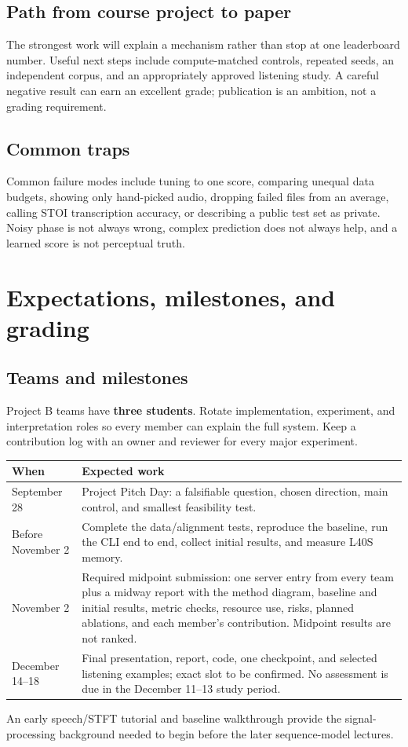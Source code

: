 \documentclass[11pt,letterpaper]{article}
\newcommand{\page}[1]{\clearpage\section{#1}}
\newcommand{\smallnote}[1]{{\small\color{graytext}#1\par}}
\begin{document}
\subsection{Path from course project to paper}
The strongest work will explain a mechanism rather than stop at one leaderboard number. Useful next steps include compute-matched controls, repeated seeds, an independent corpus, and an appropriately approved listening study. A careful negative result can earn an excellent grade; publication is an ambition, not a grading requirement.

\subsection{Common traps}
Common failure modes include tuning to one score, comparing unequal data budgets, showing only hand-picked audio, dropping failed files from an average, calling STOI transcription accuracy, or describing a public test set as private. Noisy phase is not always wrong, complex prediction does not always help, and a learned score is not perceptual truth.

\page{Expectations, milestones, and grading}
\subsection{Teams and milestones}
Project B teams have \textbf{three students}. Rotate implementation, experiment, and interpretation roles so every member can explain the full system. Keep a contribution log with an owner and reviewer for every major experiment.

\begin{center}\small
\begin{tabularx}{\linewidth}{@{}p{1.55in}Y@{}}
\toprule
When & Expected work\\\midrule
September 28 & Project Pitch Day: a falsifiable question, chosen direction, main control, and smallest feasibility test.\\
Before November 2 & Complete the data/alignment tests, reproduce the baseline, run the CLI end to end, collect initial results, and measure L40S memory.\\
November 2 & Required midpoint submission: one server entry from every team plus a midway report with the method diagram, baseline and initial results, metric checks, resource use, risks, planned ablations, and each member's contribution. Midpoint results are not ranked.\\
December 14--18 & Final presentation, report, code, one checkpoint, and selected listening examples; exact slot to be confirmed. No assessment is due in the December 11--13 study period.\\
\bottomrule
\end{tabularx}
\end{center}
\smallnote{An early speech/STFT tutorial and baseline walkthrough provide the signal-processing background needed to begin before the later sequence-model lectures.}
\end{document}
